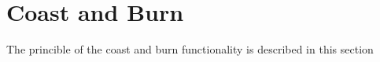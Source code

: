 \section{Coast and Burn}
The princible of the coast and burn functionality is described in this section
